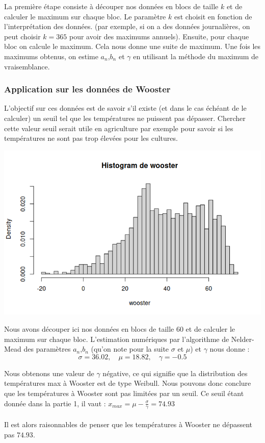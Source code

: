 \documentclass{article}
\begin{document}
La première étape consiste à découper nos données en blocs de taille $k$ et de calculer le maximum sur chaque bloc. Le paramètre
$k$ est choisit en fonction de l'interprétation des données. (par exemple, si on a des données journalières, on peut choisir $k=365$ pour avoir des maximums annuels).
Ensuite, pour chaque bloc on calcule le maximum. Cela nous donne une suite de maximum.
Une fois les maximums obtenus, on estime $a_n$,$b_n$ et $\gamma$ en utilisant la méthode du maximum de vraisemblance.

\subsubsection{Application sur les données de Wooster}
L'objectif sur ces données est de savoir s'il existe (et dans le cas échéant de le calculer) un seuil tel que les températures ne puissent pas dépasser.
Chercher cette valeur seuil serait utile en agriculture par exemple pour savoir si les températures ne sont pas trop élevées pour les cultures.

\begin{center}
	\includegraphics[scale=0.8]{./images/woosterhisto.png} 
\end{center}

Nous avons découper ici nos données en blocs de taille $60$ et de calculer le maximum sur chaque bloc.
L'estimation numériques par l'algorithme de Nelder-Mead des paramètres $a_n$,$b_n$  (qu'on note pour la suite $\sigma$ et $\mu$) et $\gamma$ nous donne :
\[
\sigma = 36.02, \quad \mu= 18.82, \quad \gamma = -0.5
\]

Nous obtenons une valeur de $\gamma$ négative, ce qui signifie que la distribution des températures max à Wooster est de type Weibull.
Nous pouvons donc conclure que les températures à Wooster sont pas limitées par un seuil.
Ce seuil étant donnée dans la partie 1, il vaut : $x_{max} = \mu - \frac{\sigma}{\gamma} = 74.93 $
\\
\\
Il est alors raisonnables de penser que les températures à Wooster ne dépassent pas $74.93$.
\end{document}
